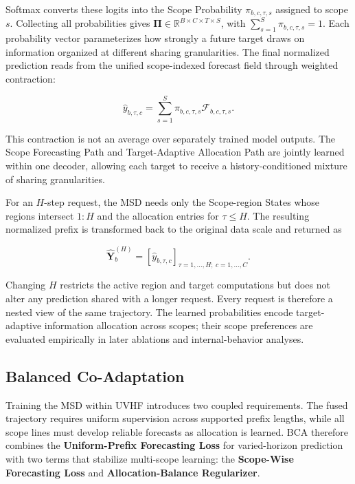 \documentclass[final,3p,times]{elsarticle}
\begin{document}
Softmax converts these logits into the Scope Probability $\pi_{b,c,\tau,s}$ assigned to scope $s$. Collecting all probabilities gives $\boldsymbol\Pi\in\mathbb R^{B\times C\times T\times S}$, with $\sum_{s=1}^{S}\pi_{b,c,\tau,s}=1$. Each probability vector parameterizes how strongly a future target draws on information organized at different sharing granularities. The final normalized prediction reads from the unified scope-indexed forecast field through weighted contraction:

\begin{equation}
\widehat y_{b,\tau,c}
=
\sum_{s=1}^{S}
\pi_{b,c,\tau,s}
\mathcal F_{b,c,\tau,s}.
\end{equation}


This contraction is not an average over separately trained model outputs. The Scope Forecasting Path and Target-Adaptive Allocation Path are jointly learned within one decoder, allowing each target to receive a history-conditioned mixture of sharing granularities.

For an $H$-step request, the MSD needs only the Scope-region States whose regions intersect $1{:}H$ and the allocation entries for $\tau\leq H$. The resulting normalized prefix is transformed back to the original data scale and returned as

\begin{equation}
\widehat{\mathbf Y}_b^{(H)}
=
\left[
\widehat y_{b,\tau,c}
\right]_{\tau=1,\ldots,H;\ c=1,\ldots,C}.
\end{equation}


Changing $H$ restricts the active region and target computations but does not alter any prediction shared with a longer request. Every request is therefore a nested view of the same trajectory. The learned probabilities encode target-adaptive information allocation across scopes; their scope preferences are evaluated empirically in later ablations and internal-behavior analyses.

\subsection{Balanced Co-Adaptation}


Training the MSD within UVHF introduces two coupled requirements. The fused trajectory requires uniform supervision across supported prefix lengths, while all scope lines must develop reliable forecasts as allocation is learned. BCA therefore combines the \textbf{Uniform-Prefix Forecasting Loss} for varied-horizon prediction with two terms that stabilize multi-scope learning: the \textbf{Scope-Wise Forecasting Loss} and \textbf{Allocation-Balance Regularizer}.
\end{document}
